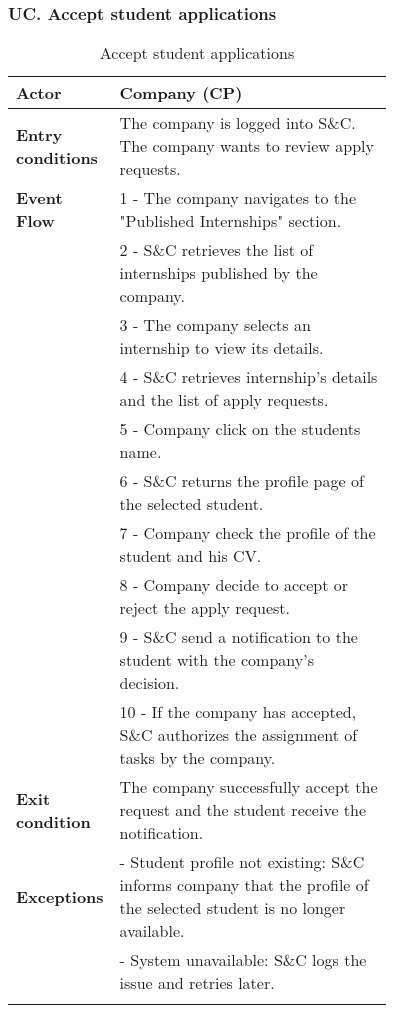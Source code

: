 \subsubsection*{UC\cuc . Accept student applications}
\begin{center}
    \begin{longtable}{|l|p{0.75\linewidth}|}
        \hline
        \textbf{Actor}            & Company (CP)\\
        \hline
        \textbf{Entry conditions} & The company is logged into S\&C. The company wants to review apply requests.\\
        \hline
        \textbf{Event Flow}     & 1 - The company navigates to the "Published                                                        Internships" section. \\
                                & 2 - S\&C retrieves the list of internships published by the company. \\
                                & 3 - The company selects an internship to view its details. \\
                                & 4 - S\&C retrieves internship's details and the list of apply requests.\\
                                & 5 - Company click on the students name.\\
                                & 6 - S\&C returns the profile page of the selected student.\\
                                & 7 - Company check the profile of the student and his CV.\\
                                & 8 - Company decide to accept or reject the apply request.\\
                                & 9 - S\&C send a notification to the student with the company’s decision.\\
                                & 10 - If the company has accepted, S\&C authorizes the assignment of tasks by the company.\\
        \hline
        \textbf{Exit condition}     & The company successfully accept the request and the student receive the notification.\\       
        \hline
        \textbf{Exceptions}     & - Student profile not existing: S\&C informs company that the profile of the selected student is no longer available. \\
                                & - System unavailable: S\&C logs the issue and retries later. \\
        \hline
        \caption{Accept student applications}
        \label{tab: accept_student_applications_usecase}
    \end{longtable}
\end{center}

